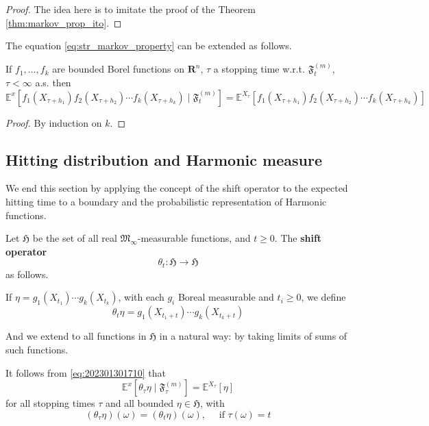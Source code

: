 \begin{proof}
    The idea here is to imitate the proof of the Theorem \ref{thm:markov_prop_ito}.
\end{proof}

The equation \eqref{eq:str_markov_property} can be extended as follows.

\begin{corollary}
    If $f_1, \ldots, f_k$ are bounded Borel functions on $\textbf{R}^n$, $\tau$ a stopping time w.r.t. $\mathfrak{F}_t^{(m)}$, $\tau < \infty$ a.s. then 
    \begin{equation}\label{eq:202301301710}
        \mathbb{E}^x [f_1(X_{\tau+h_1}) f_2(X_{\tau+h_2}) \cdots f_k(X_{\tau+h_k}) \mid \mathfrak{F}_t^{(m)}] = \mathbb{E}^{X_\tau} [f_1(X_{\tau+h_1}) f_2(X_{\tau+h_2}) \cdots f_k(X_{\tau+h_k})]
    \end{equation}
\end{corollary}

\begin{proof}
    By induction on $k$.
\end{proof}

\subsection{Hitting distribution and Harmonic measure}

We end this section by applying the concept of the shift operator to the expected hitting time to a boundary and the probabilistic representation of Harmonic functions. 

\begin{definition}
    Let $\mathfrak{H}$ be the set of all real $\mathfrak{M}_\infty$-measurable functions, and $t \geq 0$. The \textbf{shift operator} 
    \[ 
        \theta_t : \mathfrak{H} \longrightarrow \mathfrak{H}
    \]
    as follows. 

    If $\eta = g_1(X_{t_1}) \cdots g_k(X_{t_k})$, with each $g_i$ Boreal measurable and $t_i \geq 0$, we define 
    \[
        \theta_t \eta = g_1(X_{t_1 + t}) \cdots g_k(X_{t_k+t})
    \]

    And we extend to all functions in $\mathfrak{H}$ in a natural way: by taking limits of sums of such functions. 
\end{definition}

It follows from \eqref{eq:202301301710} that 
\begin{equation}\label{eq:202301301750}
    \mathbb{E}^x [\theta_\tau \eta \mid \mathfrak{F}_\tau^{(m)}] = \mathbb{E}^{X_\tau} [ \eta ]
\end{equation}
for all stopping times $\tau$ and all bounded $\eta \in \mathfrak{H}$, with 
\[
    (\theta_\tau \eta)(\omega) = (\theta_t \eta)(\omega), \quad \text{ if } \tau(\omega) = t
\]

